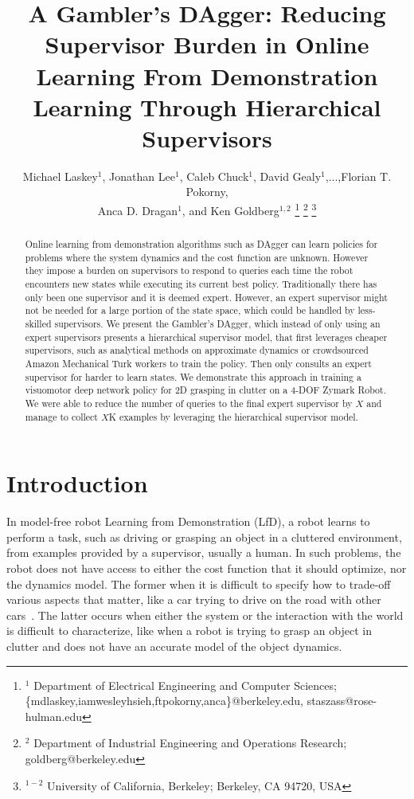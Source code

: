 \documentclass[10pt, conference]{ieeeconf}      %
\title{A Gambler's DAgger: Reducing Supervisor Burden in Online Learning From Demonstration Learning  Through Hierarchical Supervisors}
\author{Michael Laskey$^1$, Jonathan Lee$^1$, Caleb Chuck$^1$, David Gealy$^1$,...,Florian T. Pokorny,\\
 Anca D. Dragan$^1$, and Ken Goldberg$^{1,2}$%
\thanks{$^1$ Department of Electrical Engineering and Computer Sciences; {\small \{mdlaskey,iamwesleyhsieh,ftpokorny,anca\}@berkeley.edu, \small staszass@rose-hulman.edu} }%
\thanks{$^2$ Department of Industrial Engineering and Operations Research; {\small goldberg@berkeley.edu}}%
\thanks{$^{1-2}$ University of California, Berkeley;  Berkeley, CA 94720, USA}%
}
\begin{document}
\maketitle
\thispagestyle{empty}
\pagestyle{empty}



\begin{abstract}
Online learning from demonstration algorithms such as
DAgger can learn policies for problems where the system dynamics and
the cost function are unknown. However they impose a
burden on supervisors to respond to queries each time the robot
encounters new states while executing its current best policy.  Traditionally there has only been one supervisor and it is deemed expert. However, an expert supervisor might not be needed for a large portion of the state space, which could be handled by less-skilled supervisors. We present the Gambler's DAgger, which instead of only using an expert supervisors presents a hierarchical supervisor model, that first leverages cheaper supervisors, such as analytical methods on approximate dynamics or crowdsourced Amazon Mechanical Turk workers to train the policy. Then only consults an expert supervisor for harder to learn states. We demonstrate this approach in training a visuomotor deep network policy for 2D grasping in clutter on a 4-DOF Zymark Robot. We were able to reduce the number of queries to the final expert supervisor by $X$ and manage to collect $X$K examples by leveraging the hierarchical supervisor model. 
 \end{abstract}



\section{Introduction} 
In model-free robot Learning from Demonstration (LfD), a robot learns to perform a task, such as driving or grasping an object in a cluttered environment, from examples provided by a  supervisor, usually a human.  In such problems, the robot does not have access to either the cost function that it should optimize, nor the dynamics model. The former  when it is difficult to specify how to trade-off various aspects that matter, like a car trying to drive on the road with other cars~\cite{abbeel2004apprenticeship}.  The latter occurs when either the system or the interaction with the world is difficult to characterize, like when a robot is trying to grasp an object in clutter and does not have an accurate model of the object dynamics. 
\end{document}
